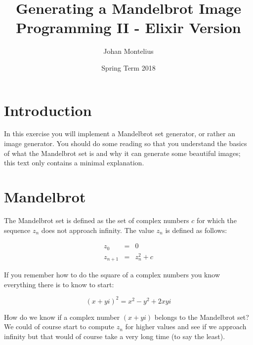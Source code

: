 \documentclass[a4paper,11pt]{article}
\begin{document}

\title{
    \textbf{Generating a Mandelbrot Image}\\
    \large{Programming II - Elixir Version}
}
\author{Johan Montelius}
\date{Spring Term 2018}
\maketitle
{}



\section*{Introduction}

In this exercise you will implement a Mandelbrot set generator, or
rather an image generator. You should do some reading so that you
understand the basics of what the Mandelbrot set is and why it can
generate some beautiful images; this text only contains a minimal
explanation.



\section{Mandelbrot}

The Mandelbrot set is defined as the set of complex numbers $c$ for
which the sequence $z_n$ does not approach infinity. The value $z_n$
is defined as follows:

\begin{eqnarray*}
    z_0 &= &0 \\ 
    z_{n+1} & = &z_n^2 + c
\end{eqnarray*}

If you remember how to do the square of a complex numbers you know
everything there is to know to start:

$$ (x + yi)^2 = x^2 - y^2 + 2xyi$$

How do we know if a complex number $(x + yi)$ belongs to the
Mandelbrot set? We could of course start to compute $z_n$ for higher
values and see if we approach infinity but that would of course take
a very long time (to say the least). 
\end{document}
